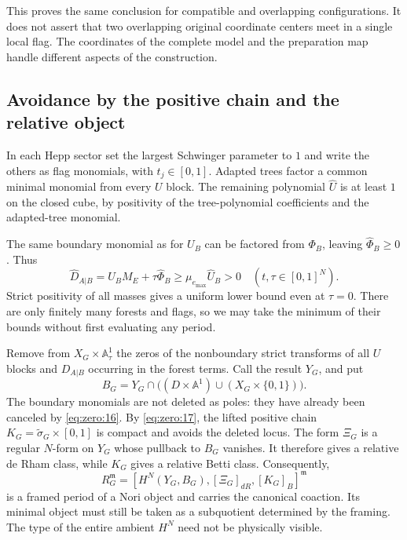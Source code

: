 \documentclass[11pt,a4paper,oneside]{article}
\theoremstyle{plain}
\theoremstyle{definition}
\theoremstyle{remark}
\numberwithin{equation}{section}
\begin{document}
This proves the same conclusion for compatible and overlapping configurations. It does not assert that two overlapping original coordinate centers meet in a single local flag. The coordinates of the complete model and the preparation map handle different aspects of the construction.

\subsection{Avoidance by the positive chain and the relative object}\label{sec:zero:7}
In each Hepp sector set the largest Schwinger parameter to $1$ and write the others as flag monomials, with \(t_j\in[0,1]\). Adapted trees factor a common minimal monomial from every $U$ block. The remaining polynomial \(\widehat U\) is at least $1$ on the closed cube, by positivity of the tree-polynomial coefficients and the adapted-tree monomial.

The same boundary monomial as for \(U_B\) can be factored from \(\Phi_B\), leaving \(\widehat\Phi_B\geq0\). Thus
\begin{equation}
\widehat D_{A|B}
    =\widehat U_B M_E+\tau\widehat\Phi_B
       \geq\mu_{e_{\max}}\widehat U_B>0
           \quad (t,\tau\in[0,1]^{N}).                        \label{eq:zero:17}
\end{equation}
Strict positivity of all masses gives a uniform lower bound even at \(\tau=0\). There are only finitely many forests and flags, so we may take the minimum of their bounds without first evaluating any period.

Remove from \(X_G\times\mathbb A^1_\tau\) the zeros of the nonboundary strict transforms of all $U$ blocks and \(D_{A|B}\) occurring in the forest terms. Call the result \(Y_G\), and put
\begin{equation}
B_G=Y_G\cap\bigl((D\times\mathbb A^1)
                  \cup(X_G\times\{0,1\})\bigr).              \label{eq:zero:18}
\end{equation}
The boundary monomials are not deleted as poles: they have already been canceled by \eqref{eq:zero:16}. By \eqref{eq:zero:17}, the lifted positive chain \(K_G=\widetilde\sigma_G\times[0,1]\) is compact and avoids the deleted locus. The form \(\Xi_G\) is a regular $N$-form on \(Y_G\) whose pullback to \(B_G\) vanishes. It therefore gives a relative de Rham class, while \(K_G\) gives a relative Betti class. Consequently,
\begin{equation}
R_G^{\mathfrak m}
  =[H^N(Y_G,B_G),[\Xi_G]_{dR},[K_G]_B]^{\mathfrak m}           \label{eq:zero:19}
\end{equation}
is a framed period of a Nori object and carries the canonical coaction. Its minimal object must still be taken as a subquotient determined by the framing. The type of the entire ambient \(H^N\) need not be physically visible.
\end{document}
